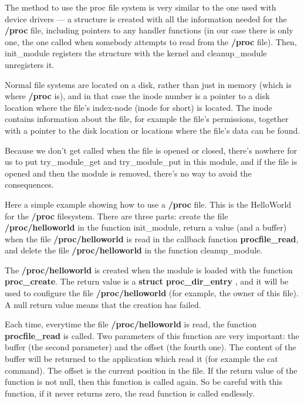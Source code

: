 \documentclass[10pt, oneside]{book}
\begin{document}
The method to use the proc file system is very similar to the one used with device drivers --- a structure is created with all the information needed for the \textbf{/proc} file, including pointers to any handler functions (in our case there is only one, the one called when somebody attempts to read from the \textbf{/proc} file).
Then, init\_module registers the structure with the kernel and cleanup\_module unregisters it.

Normal file systems are located on a disk, rather than just in memory (which is where \textbf{/proc} is), and in that case the inode number is a pointer to a disk location where the file's index-node (inode for short) is located.
The inode contains information about the file, for example the file's permissions, together with a pointer to the disk location or locations where the file's data can be found.

Because we don't get called when the file is opened or closed, there's nowhere for us to put try\_module\_get and try\_module\_put in this module, and if the file is opened and then the module is removed, there's no way to avoid the consequences.

Here a simple example showing how to use a \textbf{/proc} file.
This is the HelloWorld for the \textbf{/proc} filesystem.
There are three parts: create the file \textbf{/proc/helloworld} in the function init\_module, return a value (and a buffer) when the file \textbf{/proc/helloworld} is read in the callback function \textbf{procfile\_read}, and delete the file \textbf{/proc/helloworld} in the function cleanup\_module.

The \textbf{/proc/helloworld} is created when the module is loaded with the function \textbf{proc\_create}.
The return value is a \textbf{struct proc\_dir\_entry} , and it will be used to configure the file \textbf{/proc/helloworld} (for example, the owner of this file).
A null return value means that the creation has failed.

Each time, everytime the file \textbf{/proc/helloworld} is read, the function \textbf{procfile\_read} is called.
Two parameters of this function are very important: the buffer (the second parameter) and the offset (the fourth one).
The content of the buffer will be returned to the application which read it (for example the cat command).
The offset is the current position in the file.
If the return value of the function is not null, then this function is called again.
So be careful with this function, if it never returns zero, the read function is called endlessly.
\end{document}
